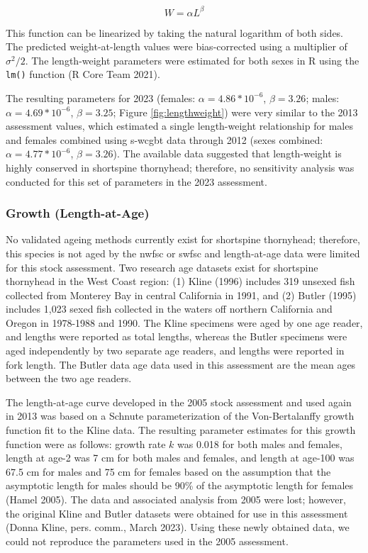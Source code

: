 \documentclass[11pt,
  english,
  letterpaper,
]{article}
\begin{document}
\begin{equation} W = \alpha L^{\beta} \end{equation}

This function can be linearized by taking the natural logarithm of both sides. The predicted weight-at-length values were bias-corrected using a multiplier of \(\sigma^2 / 2\). The length-weight parameters were estimated for both sexes in R using the \texttt{lm()} function (R Core Team 2021).

The resulting parameters for 2023 (females: \(\alpha = 4.86*10^{-6}\), \(\beta = 3.26\); males: \(\alpha = 4.69*10^{-6}\), \(\beta = 3.25\); Figure \ref{fig:lengthweight}) were very similar to the 2013 assessment values, which estimated a single length-weight relationship for males and females combined using \gls{s-wcgbt} data through 2012 (sexes combined: \(\alpha = 4.77*10^{-6}\), \(\beta=3.26\)). The available data suggested that length-weight is highly conserved in shortspine thornyhead; therefore, no sensitivity analysis was conducted for this set of parameters in the 2023 assessment.

\hypertarget{growth-length-at-age}{%
\subsubsection{Growth (Length-at-Age)}\label{growth-length-at-age}}

No validated ageing methods currently exist for shortspine thornyhead; therefore, this species is not aged by the \gls{nwfsc} or \gls{swfsc} and length-at-age data were limited for this stock assessment. Two research age datasets exist for shortspine thornyhead in the West Coast region: (1) Kline (1996) includes 319 unsexed fish collected from Monterey Bay in central California in 1991, and (2) Butler (1995) includes 1,023 sexed fish collected in the waters off northern California and Oregon in 1978-1988 and 1990. The Kline specimens were aged by one age reader, and lengths were reported as total lengths, whereas the Butler specimens were aged independently by two separate age readers, and lengths were reported in fork length. The Butler data age data used in this assessment are the mean ages between the two age readers.

The length-at-age curve developed in the 2005 stock assessment and used again in 2013 was based on a Schnute parameterization of the Von-Bertalanffy growth function fit to the Kline data. The resulting parameter estimates for this growth function were as follows: growth rate \(k\) was 0.018 for both males and females, length at age-2 was 7 cm for both males and females, and length at age-100 was 67.5 cm for males and 75 cm for females based on the assumption that the asymptotic length for males should be 90\% of the asymptotic length for females (Hamel 2005). The data and associated analysis from 2005 were lost; however, the original Kline and Butler datasets were obtained for use in this assessment (Donna Kline, pers. comm., March 2023). Using these newly obtained data, we could not reproduce the parameters used in the 2005 assessment.
\end{document}
